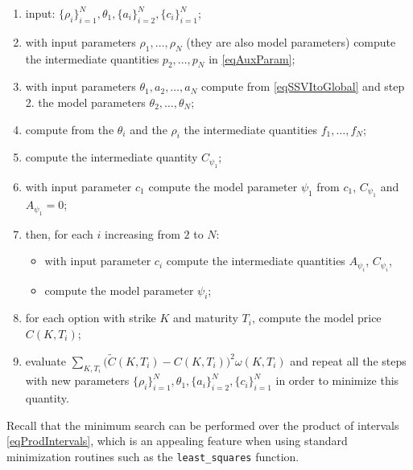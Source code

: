 \documentclass{article}
\providecommand{\tightlist}{%
      \setlength{\itemsep}{0pt}\setlength{\parskip}{0pt}}
\begin{document}
\begin{enumerate}
\def\labelenumi{\arabic{enumi}.}
\tightlist
\item
  input:
  \(\{\rho_i\}_{i=1}^N,\theta_1,\{a_i\}_{i=2}^N,\{c_i\}_{i=1}^N\);
\item
  with input parameters \(\rho_1,\dots,\rho_N\) (they are also model
  parameters) compute the intermediate quantities \(p_2,\dots,p_N\) in
  \cref{eqAuxParam};
\item
  with input parameters \(\theta_1,a_2,\dots,a_N\) compute from
  \cref{eqSSVItoGlobal} and step 2. the model parameters
  \(\theta_2,\dots,\theta_N\);
\item
  compute from the \(\theta_i\) and the \(\rho_i\) the intermediate
  quantities \(f_1,\dots,f_N\);
\item
  compute the intermediate quantity \(C_{\psi_1}\);
\item
  with input parameter \(c_1\) compute the model parameter \(\psi_1\)
  from \(c_1\), \(C_{\psi_1}\) and \(A_{\psi_1}=0\);
\item
  then, for each \(i\) increasing from \(2\) to \(N\):

  \begin{itemize}
  \tightlist
  \item
    with input parameter \(c_i\) compute the intermediate quantities
    \(A_{\psi_i}\), \(C_{\psi_i}\),
  \item
    compute the model parameter \(\psi_i\);
  \end{itemize}
\item
  for each option with strike \(K\) and maturity \(T_i\), compute the
  model price \(C(K,T_i)\);
\item
  evaluate
  \(\sum_{K, T_i}\bigl(\tilde C(K,T_i)-C(K,T_i)\bigr)^2\omega(K,T_i)\)
  and repeat all the steps with new parameters
  \(\{\rho_i\}_{i=1}^N,\theta_1,\{a_i\}_{i=2}^N,\{c_i\}_{i=1}^N\) in
  order to minimize this quantity.
\end{enumerate}

	Recall that the minimum search can be performed over the product of
intervals \cref{eqProdIntervals}, which is an appealing feature when
using standard minimization routines such as the \verb|least_squares|
function.
\end{document}
